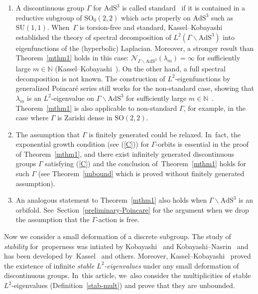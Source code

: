 \documentclass[pdftex]{sigma}
\numberwithin{equation}{section}
\begin{document}
\begin{Remark}\quad
\begin{enumerate} \itemsep=0pt
\item[(1)]
A discontinuous group $\Gamma$ for $\mathrm{AdS}^{3}$
is called standard~\cite[Definition~1.4]{KaKob16} if
it is contained in a reductive subgroup of $\mathrm{SO}_{0}(2,2)$
which acts properly on $\mathrm{AdS}^{3}$ such as $\mathrm{SU}(1,1)$.
When~$\Gamma$ is torsion-free and standard,
Kassel--Kobayashi~\cite{KaKob19,KaKob20PJA} established the theory of spectral decomposition
of $L^{2}(\Gamma\backslash\mathrm{AdS}^{3})$ into eigenfunctions of the (hyperbolic) Laplacian.
Moreover, a stronger result than Theorem~\ref{mthm1} holds in this case:
$\mathcal{N}_{\Gamma\backslash\mathrm{AdS}^{3}}(\lambda_{m}) = \infty$
for sufficiently large $m \in \mathbb{N}$ (Kassel--Kobayashi~\cite{AnaKaKob}).
On the other hand, a full spectral decomposition is not known.
The construction of $L^{2}$-eigenfunctions by generalized Poincar\'e series still works for
the non-standard case, showing that $\lambda_{m}$ is an $L^{2}$-eigenvalue on
$\Gamma\backslash\mathrm{AdS}^{3}$ for sufficiently large $m\in\mathbb{N}$~\cite{KaKob16}.
Theorem~\ref{mthm1} is also applicable to non-standard $\Gamma$,
for example, in the case where $\Gamma$ is Zariski dense in $\mathrm{SO}(2,2)$.

\item[(2)]
The assumption that $\Gamma$ is finitely generated could be relaxed. In~fact, the exponential growth condition (see (\ref{C})) for
$\Gamma$-orbits is essential in the proof of Theorem~\ref{mthm1},
and there exist infinitely generated discontinuous groups $\Gamma$ satisfying (\ref{C})
and the conclusion of~Theorem~\ref{mthm1} holds for such $\Gamma$
(see Theorem~\ref{unbound} which is proved without finitely generated assumption).

\item[(3)]
An analogous statement to Theorem~\ref{mthm1} also holds when
$\Gamma\backslash\mathrm{AdS}^{3}$ is an orbifold.
See~Section~\ref{preliminary-Poincare} for the argument when
we drop the assumption that the $\Gamma$-action is free.
\end{enumerate}
\end{Remark}

Now we consider a small deformation of a discrete subgroup.
The study of \textit{stability} for~pro\-pe\-rness
was intiated by Kobayashi~\cite{Kob98} and Kobayashi--Nasrin~\cite{KoNa06}
and has been developed
by~Kassel~\cite{Ka12} and others.
Moreover, Kassel--Kobayashi~\cite{KaKob16} proved
the existence of infinite \textit{stable $L^2$-eigenvalues}
under any small deformation of discontinuous groups. In~this article, we~also consider
the multiplicities of stable $L^2$-eigenvalues (Definition~\ref{stab-mult})
and prove that they are unbounded.
\end{document}
